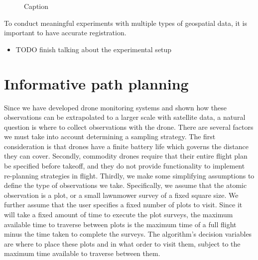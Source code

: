 \begin{figure}
    \hfill
    \caption{Caption}
    \label{fig:enter-label}
\end{figure}

To conduct meaningful experiments with multiple types of geospatial data, it is important to have accurate registration. 

\begin{itemize}
    \item TODO finish talking about the experimental setup 
\end{itemize}


\section{Informative path planning}

Since we have developed drone monitoring systems and shown how these observations can be extrapolated to a larger scale with satellite data, a natural question is where to collect observations with the drone. There are several factors we must take into account determining a sampling strategy. The first consideration is that drones have a finite battery life which governs the distance they can cover. Secondly, commodity drones require that their entire flight plan be specified before takeoff, and they do not provide functionality to implement re-planning strategies in flight. Thirdly, we make some simplifying assumptions to define the type of observations we take. Specifically, we assume that the atomic observation is a plot, or a small lawnmower survey of a fixed square size. We further assume that the user specifies a fixed number of plots to visit. Since it will take a fixed amount of time to execute the plot surveys, the maximum available time to traverse between plots is the maximum time of a full flight minus the time taken to complete the surveys. The algorithm's decision variables are where to place these plots and in what order to visit them, subject to the maximum time available to traverse between them.

